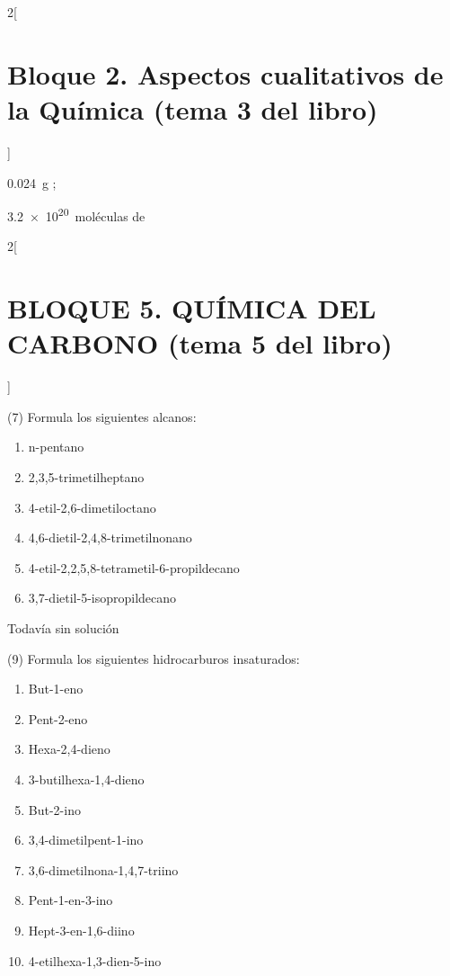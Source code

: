 \documentclass[10pt]{article}
\begin{document}
\begin{multicols}{2}[
    \section{Bloque 2. Aspectos cualitativos de la Química (tema 3 del libro)}
  ]
\begin{solution}
  \begin{enumerate*}
    \item \SI{0.024}{\gram} ;
    \item \SI{3.2e20}{moléculas} de 
  \end{enumerate*}
\end{solution}

\end{multicols}






\begin{multicols}{2}[
  \section{BLOQUE 5. QUÍMICA DEL CARBONO (tema 5 del libro)}
  ]

\begin{exercise}[
    tags    = {},
    topics  = {química, química orgánica, orgánica},
    source  = {FQ 1B MGH 2016, p126, e7},
  ]
  (7) Formula los siguientes alcanos:
  \begin{enumerate}
    \item n-pentano
    \item 2,3,5-trimetilheptano
    \item 4-etil-2,6-dimetiloctano
    \item 4,6-dietil-2,4,8-trimetilnonano
    \item 4-etil-2,2,5,8-tetrametil-6-propildecano
    \item 3,7-dietil-5-isopropildecano
  \end{enumerate}
\end{exercise}

\begin{solution}[print=false]
  Todavía sin solución
\end{solution}




\begin{exercise}[
    tags    = {},
    topics  = {química, química orgánica, orgánica},
    source  = {FQ 1B MGH 2016, p129, e9},
  ]
  (9) Formula los siguientes hidrocarburos insaturados:
  \begin{enumerate}
    \item But-1-eno
    \item Pent-2-eno
    \item Hexa-2,4-dieno
    \item 3-butilhexa-1,4-dieno
    \item But-2-ino
    \item 3,4-dimetilpent-1-ino
    \item 3,6-dimetilnona-1,4,7-triino
    \item Pent-1-en-3-ino
    \item Hept-3-en-1,6-diino
    \item 4-etilhexa-1,3-dien-5-ino
  \end{enumerate}
\end{exercise}


\end{multicols}
\end{document}
